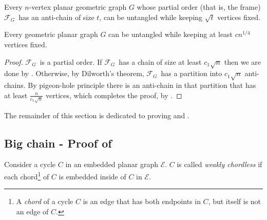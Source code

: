 \documentclass[lotsofwhite,charterfonts, letter]{patmorin}
\newcommand{\fg}{\ensuremath{\mathcal{F}_G}}
\begin{document}
\begin{lem}
Every $n$-vertex planar geometric graph $G$ whose partial order (that is, the frame) \fg\ has an anti-chain of size $t$, can be untangled while keeping $\sqrt{t}$ vertices fixed.
\end{lem}

\begin{thm}
Every geometric planar graph $G$ can be untangled while keeping at least $cn^{1/4}$ vertices fixed.
\end{thm}

\begin{proof}
\fg\ is a partial order. If \fg\ has a chain of size at least $c_1\sqrt{n}$ then we are done by . Otherwise, by Dilworth's theorem, \fg\ has a partition into $c_1\sqrt{n}$ anti-chains. By pigeon-hole principle there is an anti-chain in that partition that has at least $\frac{n}{c_1\sqrt{n}}$ vertices, which completes the proof, by .
\end{proof}



The remainder of this section is dedicated to proving  and .

\subsection{Big chain - Proof of }

Consider a cycle $C$ in an embedded planar graph $\mathcal E$. $C$ is called \emph{weakly chordless} if each chord\footnote{A \emph{chord} of a cycle $C$ is an edge  that has both endpoints in $C$, but itself is not an edge of $C$.} of $C$ is embedded inside of $C$ in $\mathcal E$.
\end{document}
